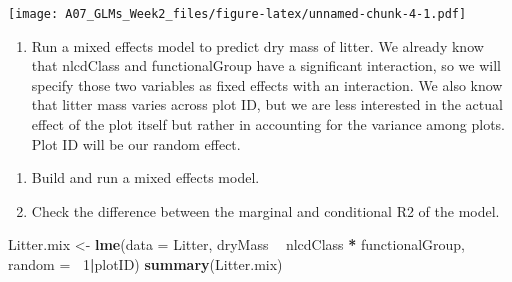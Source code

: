 \documentclass[]{article}
\newenvironment{Shaded}{\begin{snugshade}}{\end{snugshade}}
\newcommand{\KeywordTok}[1]{\textcolor[rgb]{0.13,0.29,0.53}{\textbf{#1}}}
\newcommand{\DataTypeTok}[1]{\textcolor[rgb]{0.13,0.29,0.53}{#1}}
\newcommand{\DecValTok}[1]{\textcolor[rgb]{0.00,0.00,0.81}{#1}}
\newcommand{\StringTok}[1]{\textcolor[rgb]{0.31,0.60,0.02}{#1}}
\newcommand{\OperatorTok}[1]{\textcolor[rgb]{0.81,0.36,0.00}{\textbf{#1}}}
\newcommand{\NormalTok}[1]{#1}
\providecommand{\tightlist}{%
  \setlength{\itemsep}{0pt}\setlength{\parskip}{0pt}}
\begin{document}
\texttt{[image: A07\_GLMs\_Week2\_files/figure-latex/unnamed-chunk-4-1.pdf]}

\begin{enumerate}
\def\labelenumi{\arabic{enumi}.}
\setcounter{enumi}{8}
\tightlist
\item
  Run a mixed effects model to predict dry mass of litter. We already
  know that nlcdClass and functionalGroup have a significant
  interaction, so we will specify those two variables as fixed effects
  with an interaction. We also know that litter mass varies across plot
  ID, but we are less interested in the actual effect of the plot itself
  but rather in accounting for the variance among plots. Plot ID will be
  our random effect.
\end{enumerate}

\begin{enumerate}
\def\labelenumi{\alph{enumi}.}
\tightlist
\item
  Build and run a mixed effects model.
\item
  Check the difference between the marginal and conditional R2 of the
  model.
\end{enumerate}

\begin{Shaded}
\begin{Highlighting}[]
\NormalTok{Litter.mix <-}\StringTok{ }\KeywordTok{lme}\NormalTok{(}\DataTypeTok{data =}\NormalTok{ Litter, dryMass }\OperatorTok{~}\StringTok{ }\NormalTok{nlcdClass }\OperatorTok{*}\StringTok{ }\NormalTok{functionalGroup,}
                  \DataTypeTok{random =} \OperatorTok{~}\DecValTok{1}\OperatorTok{|}\NormalTok{plotID)}
\KeywordTok{summary}\NormalTok{(Litter.mix)}
\end{Highlighting}
\end{Shaded}
\end{document}
